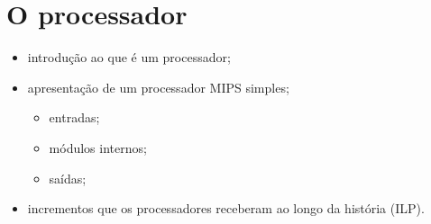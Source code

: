 \section{O processador}

    \begin{itemize}
        \item introdução ao que é um processador;
        \item apresentação de um processador MIPS simples;
        \begin{itemize}
            \item entradas;
            \item módulos internos;
            \item saídas;
        \end{itemize}
        \item incrementos que os processadores receberam ao longo da 
        história (ILP).
    \end{itemize}